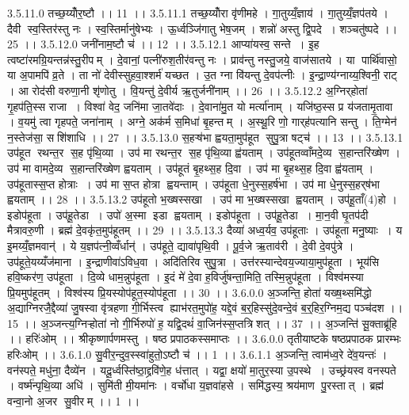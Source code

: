 3.5.11.0
तच्छ॒य्योँर॒ष्टौ ।। 11 ।।
3.5.11.1
तच्छ॒य्योँरा वृ॑णीमहे । गा॒तुय्यँ॒ज्ञाय॑ । गा॒तुय्यँ॒ज्ञप॑तये । दैवी स्व॒स्तिर॑स्तु नः । स्व॒स्तिर्मानु॑षेभ्यः । ऊ॒र्ध्वञ्जि॑गातु भेष॒जम् । शन्नो॑ अस्तु द्वि॒पदे । शञ्चतु॑ष्पदे ।। 25 ।।
3.5.12.0
जनी॑नाम॒ष्टौ च॑ ।। 12 ।।
3.5.12.1
आप्या॑यस्व॒ सन्ते । इ॒ह त्वष्टा॑रमग्रि॒यन्तन्न॑स्तु॒रीपम् । दे॒वानां॒ पत्नी॑रुश॒तीर॑वन्तु नः । प्राव॑न्तु नस्तु॒जये॒ वाज॑सातये । या पार्थि॑वासो॒ या अ॒पामपि॑ व्र॒ते । ता नो॑ देवीस्सुहवा॒श्शर्म॑ यच्छत । उ॒त ग्ना वि॑यन्तु दे॒वप॑त्नीः । इ॒न्द्रा॒ण्य॑ग्नाय्य॒श्विनी॒ राट् । आ रोद॑सी वरुणा॒नी शृ॑णोतु । वि॒यन्तु॑ दे॒वीर्य ऋ॒तुर्जनी॑नाम् ।। 26 ।।
3.5.12.2
अ॒ग्निर्‌होता॑ गृ॒हप॑ति॒स्स राजा । विश्वा॑ वेद॒ जनि॑मा जा॒तवे॑दाः । दे॒वाना॑मु॒त यो मर्त्या॑नाम् । यजि॑ष्ठ॒स्स प्र य॑जतामृ॒तावा । व॒यमु॑ त्वा गृहपते॒ जना॑नाम् । अग्ने॒ अक॑र्म स॒मिधा॑ बृ॒हन्तम् । अ॒स्थू॒रि णो॒ गार्‌ह॑पत्यानि सन्तु । ति॒ग्मेन॑ न॒स्तेज॑सा॒ सशि॑शाधि ।। 27 ।।
3.5.13.0
स॒हऱ्ष॑भा ह्वयता॒मुप॑हूत सुपु॒त्रा षट्च॑ ।। 13 ।।
3.5.13.1
उप॑हूत रथन्त॒र स॒ह पृ॑थि॒व्या । उप॑ मा रथन्त॒र स॒ह पृ॑थि॒व्या ह्व॑यताम् । उप॑हूतव्वाँमदे॒व्य स॒हान्तरि॑ख्षेण । उप॑ मा वामदे॒व्य स॒हान्तरि॑ख्षेण ह्वयताम् । उप॑हूतं बृ॒हथ्स॒ह दि॒वा । उप॑ मा बृ॒हथ्स॒ह दि॒वा ह्व॑यताम् । उप॑हूतास्स॒प्त होत्राः । उप॑ मा स॒प्त होत्रा ह्वयन्ताम् । उप॑हूता धे॒नुस्स॒हर्ष॑भा । उप॑ मा धे॒नुस्स॒हर्‌ष॑भा ह्वयताम् ।। 28 ।।
3.5.13.2
उप॑हूतो भ॒ख्षस्सखा । उप॑ मा भ॒ख्षस्सखा ह्वयताम् । उप॑हू॒ताँ(4)हो । इडोप॑हूता । उप॑हू॒तेडा । उपो॑ अ॒स्मा इडा ह्वयताम् । इडोप॑हूता । उप॑हू॒तेडा । मा॒न॒वी घृ॒तप॑दी मैत्रावरु॒णी । ब्रह्म॑ दे॒वकृ॑त॒मुप॑हूतम् ।। 29 ।।
3.5.13.3
दैव्या॑ अध्व॒र्यव॒ उप॑हूताः । उप॑हूता मनु॒ष्याः । य इ॒मय्यँ॒ज्ञमवान्॑ । ये य॒ज्ञप॑त्नी॒व्वँर्धान्॑ । उप॑हूते॒ द्यावा॑पृथि॒वी । पू॒र्व॒जे ऋ॒ताव॑री । दे॒वी दे॒वपु॑त्रे । उप॑हूते॒यय्यँज॑माना । इ॒न्द्राणीवा॑ऽविध॒वा । अदि॑तिरिव सुपु॒त्रा । उत्त॑रस्यान्देवय॒ज्याया॒मुप॑हूता । भूय॑सि हवि॒ष्कर॑ण॒ उप॑हूता । दि॒व्ये धाम॒न्नुप॑हूता । इ॒दं मे॑ दे॒वा ह॒विर्जु॑षन्ता॒मिति॒ तस्मि॒न्नुप॑हूता । विश्व॑मस्या प्रि॒यमुप॑हूतम् । विश्व॑स्य प्रि॒यस्योप॑हूत॒स्योप॑हूता ।। 30 ।।
3.6.0.0
अ॒ञ्जन्ति॒ होता॑ यख्ष॒थ्समि॑द्धो अ॒द्याग्निरजै॒द्दैव्या॑ जु॒षस्वा वृ॑त्रहणा गी॒र्भिस्त्व ह्याभ॑रत॒मुपो॑ह॒ यद्दे॒वं ब॒र्॒हिस्सु॑दे॒वन्दे॒वं ब॒र्॒हिर॒ग्निम॒द्य पञ्च॑दश ।। 15 ।। अ॒ञ्जन्त्य॒ग्निऱ्होता॑ नो गी॒र्भिरुपो॑ ह॒ यद्वि॒दथं॑ वा॒जिन॑स्स॒प्तत्रि॑शत् ।। 37 ।। अ॒ञ्जन्ति॑ सू॒क्ताब्रू॑हि ।। हरिः॑ओम् ।। श्रीकृष्णार्पणमस्तु । षष्ठ प्रपाठकस्समाप्तः ।।
3.6.0.0
तृतीयाष्टके षष्ठप्रपाठक प्रारम्भः हरिःओम् ।।
3.6.1.0
सु॒वीर॒न्दुव॒स्स्वा॑हुतो॒ऽष्टौ च॑ ।। 1 ।।
3.6.1.1
अ॒ञ्जन्ति॒ त्वाम॑ध्व॒रे दे॑व॒यन्तः॑ । वन॑स्पते॒ मधु॑ना॒ दैव्ये॑न । यदू॒र्ध्वस्ति॑ष्ठा॒द्द्रवि॑णे॒ह ध॑त्तात् । यद्वा॒ क्षयो॑ मा॒तुर॒स्या उ॒पस्थे । उच्छ्र॑यस्व वनस्पते । वर्ष्म॑न्पृथि॒व्या अधि॑ । सुमि॑ती मी॒यमा॑नः । वर्चो॑धा य॒ज्ञवा॑हसे । समि॑द्धस्य॒ श्रय॑माण पु॒रस्तात् । ब्रह्म॑ वन्वा॒नो अ॒जर॑ सु॒वीरम् ।। 1 ।।
